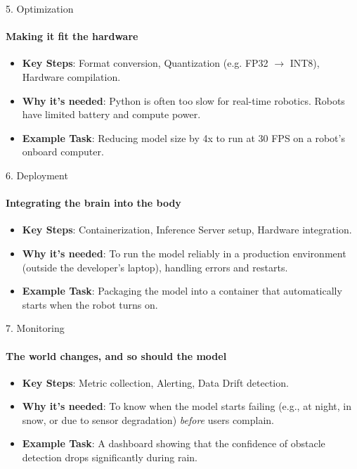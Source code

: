\documentclass[aspectratio=169]{beamer}
\begin{document}
\begin{frame}[t]{5. Optimization}
    \framesubtitle{Making it fit the hardware}
    \begin{itemize}
        \item \textbf{Key Steps}: Format conversion, Quantization (e.g. FP32 $\rightarrow$ INT8), Hardware compilation.
        \item \textbf{Why it's needed}: Python is often too slow for real-time robotics. Robots have limited battery and compute power.
        \item \textbf{Example Task}: Reducing model size by 4x to run at 30 FPS on a robot's onboard computer.
    \end{itemize}
\end{frame}

\begin{frame}[t]{6. Deployment}
    \framesubtitle{Integrating the brain into the body}
    \begin{itemize}
        \item \textbf{Key Steps}: Containerization, Inference Server setup, Hardware integration.
        \item \textbf{Why it's needed}: To run the model reliably in a production environment (outside the developer's laptop), handling errors and restarts.
        \item \textbf{Example Task}: Packaging the model into a container that automatically starts when the robot turns on.
    \end{itemize}
\end{frame}

\begin{frame}[t]{7. Monitoring}
    \framesubtitle{The world changes, and so should the model}
    \begin{itemize}
        \item \textbf{Key Steps}: Metric collection, Alerting, Data Drift detection.
        \item \textbf{Why it's needed}: To know when the model starts failing (e.g., at night, in snow, or due to sensor degradation) \textit{before} users complain.
        \item \textbf{Example Task}: A dashboard showing that the confidence of obstacle detection drops significantly during rain.
    \end{itemize}
\end{frame}
\end{document}
